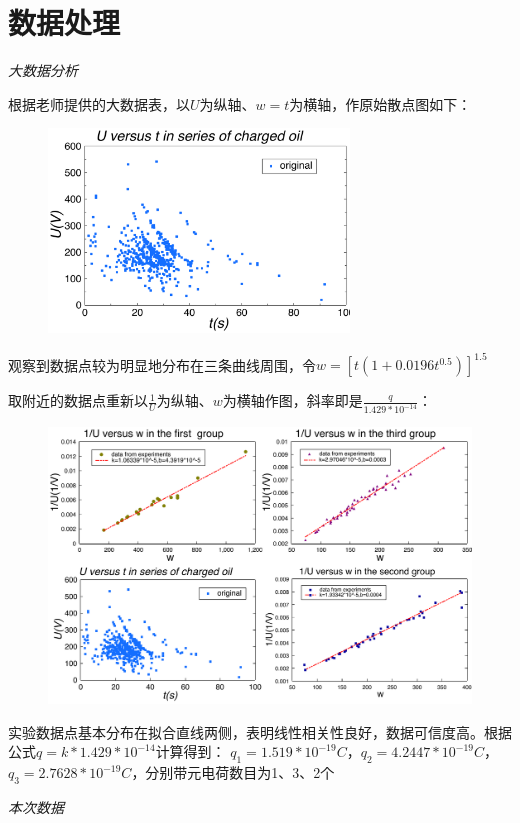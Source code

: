 \documentclass[UTF8]{ctexart}
\begin{document}
    \section{数据处理}
    \begin{center}
        \emph{大数据分析}
    \end{center}

    根据老师提供的大数据表，以$U$为纵轴、$w=t$为横轴，作原始散点图如下：
    \begin{figure}[ht]
        \centering 
        \includegraphics[width=8cm]{original.pdf}
    \end{figure}

    观察到数据点较为明显地分布在三条曲线周围，令$w=[t(1+0.0196t^{0.5})]^{1.5}$

    
    取附近的数据点重新以$\frac1U$为纵轴、$w$为横轴作图，斜率即是$\frac{q}{1.429*10^{-14}}$：
    \begin{figure}[ht]
        \centering 
        \includegraphics[width=14cm]{fimad.pdf}
    \end{figure}

    实验数据点基本分布在拟合直线两侧，表明线性相关性良好，数据可信度高。根据公式$q=k*1.429*10^{-14}$计算得到：
    $q_1=1.519*10^{-19}C$，$q_2=4.2447*10^{-19}C$，$q_3=2.7628*10^{-19}C$，分别带元电荷数目为1、3、2个
    \begin{center}
        \emph{本次数据}
    \end{center}
\end{document}
